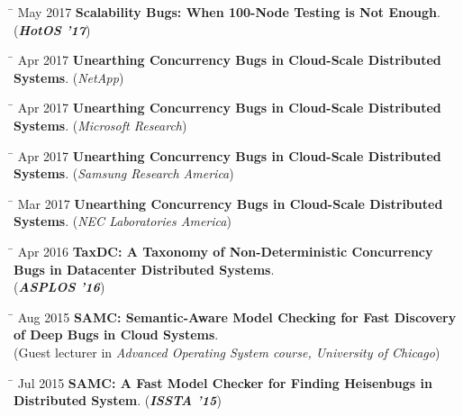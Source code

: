 \documentclass[10pt]{article} %
\begin{document}
\begin{tabbing}
\hspace{2.5cm} \= \kill
May 2017 \> \textbf{Scalability Bugs: When 100-Node Testing is Not Enough}. (\textbf{\textit{HotOS '17}})\footnotemark
\end{tabbing}

\begin{tabbing}
\hspace{2.5cm} \= \kill
Apr 2017 \> \textbf{Unearthing Concurrency Bugs in Cloud-Scale Distributed Systems}. (\textit{NetApp})
\end{tabbing}

\begin{tabbing}
\hspace{2.5cm} \= \kill
Apr 2017 \> \textbf{Unearthing Concurrency Bugs in Cloud-Scale Distributed Systems}. (\textit{Microsoft Research})
\end{tabbing}

\begin{tabbing}
\hspace{2.5cm} \= \kill
Apr 2017 \> \textbf{Unearthing Concurrency Bugs in Cloud-Scale Distributed Systems}. (\textit{Samsung Research America})
\end{tabbing}

\begin{tabbing}
\hspace{2.5cm} \= \kill
Mar 2017 \> \textbf{Unearthing Concurrency Bugs in Cloud-Scale Distributed Systems}. (\textit{NEC Laboratories America})
\end{tabbing}

\begin{tabbing}
\hspace{2.5cm} \= \kill
Apr 2016 \> \textbf{TaxDC: A Taxonomy of Non-Deterministic Concurrency Bugs in Datacenter Distributed Systems}. \\
\> (\textbf{\textit{ASPLOS '16}})
\end{tabbing}

\begin{tabbing}
\hspace{2.5cm} \= \kill
Aug 2015 \> \textbf{SAMC: Semantic-Aware Model Checking for Fast Discovery of Deep Bugs in Cloud Systems}. \\
\> (Guest lecturer in \textit{Advanced Operating System course, University of Chicago})
\end{tabbing}

\begin{tabbing}
\hspace{2.5cm} \= \kill
Jul 2015 \> \textbf{SAMC: A Fast Model Checker for Finding Heisenbugs in Distributed System}. (\textbf{\textit{ISSTA '15}})
\end{tabbing}
\end{document}
